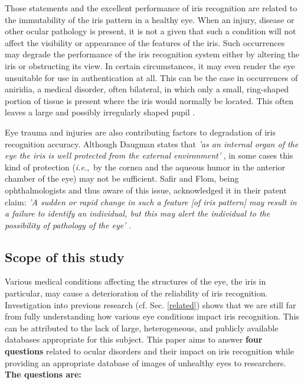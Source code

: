 \documentclass[article,12pt]{elsarticle}
\newcommand{\ie}{{\it i.e.},~}
\begin{document}
Those statements and the excellent performance of iris recognition are related to the immutability of the iris pattern in a healthy eye. When an injury, disease or other ocular pathology is present, it is not a given that such a condition will not affect the visibility or appearance of the features of the iris. Such occurrences may degrade the performance of the iris recognition system either by altering the iris or obstructing its view. In certain circumstances, it may even render the eye unsuitable for use in authentication at all. This can be the case in occurrences of aniridia, a medical disorder, often bilateral, in which only a small, ring-shaped portion of tissue is present where the iris would normally be located. This often leaves a large and possibly irregularly shaped pupil \cite{Aniridia}.

Eye trauma and injuries are also contributing factors to degradation of iris recognition accuracy. Although Daugman states that \emph{'as an internal organ of the eye the iris is well protected from the external environment'} \cite{DaugmanPatent}, in some cases this kind of protection (\ie by the cornea and the aqueous humor in the anterior chamber of the eye) may not be sufficient. Safir and Flom, being ophthalmologists and thus aware of this issue, acknowledged it in their patent claim: \emph{'A sudden or rapid change in such a feature [of iris pattern] may result in a failure to identify an individual, but this may alert the individual to the possibility of pathology of the eye'} \cite{SafirFlom}.

\subsection{Scope of this study} 

Various medical conditions affecting the structures of the eye, the iris in particular, may cause a deterioration of the reliability of iris recognition. Investigation into previous research (cf. Sec. \ref{related}) shows that we are still far from fully understanding how various eye conditions impact iris recognition. This can be attributed to the lack of large, heterogeneous, and publicly available databases appropriate for this subject. This paper aims to answer \textbf{four questions} related to ocular disorders and their impact on iris recognition while providing an appropriate database of images of unhealthy eyes to researchers. \textbf{The questions are:}
\end{document}
